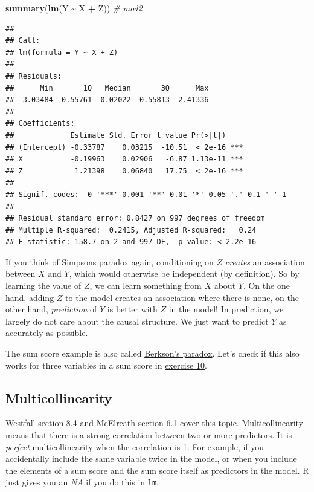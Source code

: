 \documentclass[
]{book}
\newenvironment{Shaded}{\begin{snugshade}}{\end{snugshade}}
\newcommand{\CommentTok}[1]{\textcolor[rgb]{0.56,0.35,0.01}{\textit{#1}}}
\newcommand{\FunctionTok}[1]{\textcolor[rgb]{0.13,0.29,0.53}{\textbf{#1}}}
\newcommand{\NormalTok}[1]{#1}
\newcommand{\SpecialCharTok}[1]{\textcolor[rgb]{0.81,0.36,0.00}{\textbf{#1}}}
\begin{document}
\begin{Shaded}
\begin{Highlighting}[]
\FunctionTok{summary}\NormalTok{(}\FunctionTok{lm}\NormalTok{(Y }\SpecialCharTok{\textasciitilde{}}\NormalTok{ X }\SpecialCharTok{+}\NormalTok{ Z)) }\CommentTok{\# mod2}
\end{Highlighting}
\end{Shaded}

\begin{verbatim}
## 
## Call:
## lm(formula = Y ~ X + Z)
## 
## Residuals:
##      Min       1Q   Median       3Q      Max 
## -3.03484 -0.55761  0.02022  0.55813  2.41336 
## 
## Coefficients:
##             Estimate Std. Error t value Pr(>|t|)    
## (Intercept) -0.33787    0.03215  -10.51  < 2e-16 ***
## X           -0.19963    0.02906   -6.87 1.13e-11 ***
## Z            1.21398    0.06840   17.75  < 2e-16 ***
## ---
## Signif. codes:  0 '***' 0.001 '**' 0.01 '*' 0.05 '.' 0.1 ' ' 1
## 
## Residual standard error: 0.8427 on 997 degrees of freedom
## Multiple R-squared:  0.2415, Adjusted R-squared:   0.24 
## F-statistic: 158.7 on 2 and 997 DF,  p-value: < 2.2e-16
\end{verbatim}

If you think of Simpsons paradox again, conditioning on \(Z\) \emph{creates} an association between \(X\) and \(Y\),
which would otherwise be independent (by definition). So by learning the value of \(Z\), we can learn something
from \(X\) about \(Y\). On the one hand, adding \(Z\) to the model creates an association where there is none,
on the other hand, \emph{prediction} of \(Y\) is better with \(Z\) in the model! In prediction, we largely
do not care about the causal structure. We just want to predict \(Y\) as accurately as possible.

The sum score example is also called \href{https://en.wikipedia.org/wiki/Berkson\%27s_paradox}{Berkson's paradox}.
Let's check if this also works for three variables in a sum score
in \hyperref[exercise10_multiple_regression]{exercise 10}.

\subsection{Multicollinearity}\label{multicollinearity}

Westfall section 8.4 and McElreath section 6.1 cover this topic.
\href{https://en.wikipedia.org/wiki/Multicollinearity}{Multicollinearity} means that there is a strong
correlation between two or more predictors. It is \emph{perfect} multicollinearity when the correlation is 1.
For example, if you accidentally include the same variable twice in the model, or when you include
the elements of a sum score and the sum score itself as predictors in the model. R just gives you
an \emph{NA} if you do this in \texttt{lm}.
\end{document}
